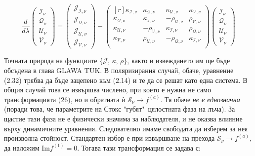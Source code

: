 \begin{equation}
	\frac{d}{d\lambda} \begin{pmatrix}
							\mathcal{I}_\nu\\
							\mathcal{Q}_\nu\\
							\mathcal{U}_\nu\\
							\mathcal{V}_\nu
					     \end{pmatrix} = 
					     \begin{pmatrix}
					     	\mathcal{J}_\mathcal{I,\nu}\\
					     	\mathcal{J}_\mathcal{Q,\nu}\\
					     	\mathcal{J}_\mathcal{U,\nu}\\
					     	\mathcal{J}_\mathcal{V,\nu}
					     \end{pmatrix}
					     -	\begin{pmatrix*}[r]
					     	\kappa_\mathcal{I,\nu} & \kappa_\mathcal{Q,\nu} & \kappa_\mathcal{U,\nu} & \kappa_\mathcal{V,\nu}\\
					        \kappa_\mathcal{Q,\nu}& \kappa_\mathcal{I,\nu}& -\rho_\mathcal{U,\nu}& \rho_\mathcal{V,\nu}\\     	
					     	\kappa_\mathcal{U,\nu}& -\rho_\mathcal{V,\nu}& \kappa_\mathcal{I,\nu}& \rho_\mathcal{Q,\nu}\\	  
					     	 \kappa_\mathcal{V,\nu}& \rho_\mathcal{U,\nu}& -\rho_\mathcal{Q,\nu}& \kappa_\mathcal{I,\nu}\\
					     	\end{pmatrix*}
					     	\begin{pmatrix}
					     		\mathcal{I}_\nu\\
					     		\mathcal{Q}_\nu\\
					     		\mathcal{U}_\nu\\
					     		\mathcal{V}_\nu
					     	\end{pmatrix}
\end{equation}

Точната природа на функциите $\{\mathcal{J},\,\mathcal{\kappa},\,\mathcal{\rho}\}$, както и извеждането им ще бъде обсъдена в глава {\color{red} GLAWA TUK}. В поляризирания случай, обаче, уравнение (2.32) трябва да бъде зацепено към (2.14) и те да се решат като една система. В общия случай това се извършва числено, при което е нужна не само трансформацията (26), но и обратната ѝ $\mathcal{S}_\nu\rightarrow f^{(a)}$. Тя обаче \emph{не е еднозначна} (поради това, че параметрите на Стокс "губят"$\,$ цялостната фаза на лъча). За щастие тази фаза не е физически значима за наблюдателя, и не оказва влияние върху динамичните уравнения. Следователно имаме свободата да изберем за нея произволна стойност. Стандартен избор е при извършване на прехода $\mathcal{S}_\nu\rightarrow f^{(a)}$, да наложим $\text{Im}{f^{(1)}} = 0$. Тогава тази трансформация се задава с:

